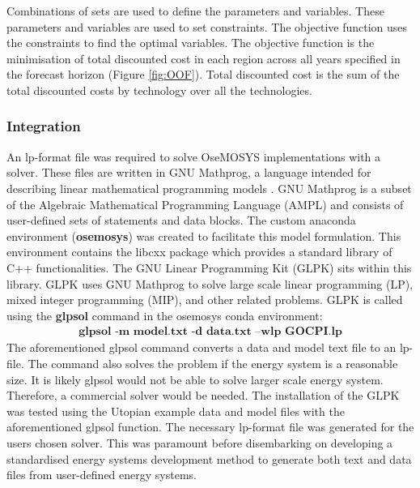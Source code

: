 \documentclass[12pt]{article}
\begin{document}
Combinations of sets are used to define the parameters and variables.
These parameters and variables are used to set constraints. 
The objective function uses the constraints to find the optimal variables.
The objective function is the minimisation of total discounted cost in each region across all years specified in the forecast horizon (Figure \ref{fig:OOF}).
Total discounted cost is the sum of the total discounted costs by technology over all the technologies.

\subsubsection{Integration}
An lp-format file was required to solve OseMOSYS implementations with a solver.
These files are written in GNU Mathprog, a language intended for describing linear mathematical programming models \cite{GNU_Mathprog}. 
GNU Mathprog is a subset of the Algebraic Mathematical Programming Language (AMPL) \cite{AMPL} and consists of user-defined sets of statements and data blocks.
The custom anaconda environment (\textbf{osemosys}) was created to facilitate this model formulation. This environment contains the libcxx package which provides a standard library of C++ functionalities.
The GNU Linear Programming Kit (GLPK) sits within this library. GLPK uses GNU Mathprog to solve large scale linear programming (LP), mixed integer programming (MIP), and other related problems. 
GLPK is called using the \textbf{glpsol} command in the osemosys conda environment:
\begin{align*}	
	\textbf{glpsol -m model.txt -d data.txt --wlp GOCPI.lp}
\end{align*}
The aforementioned glpsol command converts a data and model text file to an lp-file. 
The command also solves the problem if the energy system is a reasonable size.
It is likely glpsol would not be able to solve larger scale energy system. Therefore, a commercial solver would be needed.
The installation of the GLPK was tested using the Utopian example data and model files with the aforementioned glpsol function.
The necessary lp-format file was generated for the users chosen solver. 
This was paramount before disembarking on developing a standardised energy systems development method to generate both text and data files from user-defined energy systems.
\end{document}
